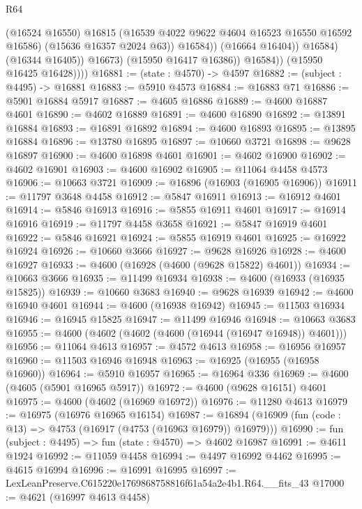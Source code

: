 \begin{lexlean}{R64}
\begin{coremodule}
                              (@16524 @16550)
                              @16815
                              (@16539 @4022 @9622 @4604 @16523 @16550 @16592 @16586)
                              (@15636 @16357 @2024 @63))
                            @16584))
                        (@16664 @16404))
                      @16584)
                    (@16344 @16405))
                  @16673)
                (@15950 @16417 @16386))
              @16584))
          (@15950 @16425 @16428))))
@16881 := (state : @4570) -> @4597
@16882 := (subject : @4495) -> @16881
@16883 := @5910 @4573
@16884 := @16883 @71
@16886 := @5901 @16884 @5917
@16887 := @4605 @16886
@16889 := @4600 @16887 @4601
@16890 := @4602 @16889
@16891 := @4600 @16890
@16892 := @13891 @16884
@16893 := @16891 @16892
@16894 := @4600 @16893
@16895 := @13895 @16884
@16896 := @13780 @16895
@16897 := @10660 @3721
@16898 := @9628 @16897
@16900 := @4600 @16898 @4601
@16901 := @4602 @16900
@16902 := @4602 @16901
@16903 := @4600 @16902
@16905 := @11064 @4458 @4573
@16906 := @10663 @3721
@16909 := @16896 (@16903 (@16905 @16906))
@16911 := @11797 @3648 @4458
@16912 := @5847 @16911
@16913 := @16912 @4601
@16914 := @5846 @16913
@16916 := @5855 @16911 @4601
@16917 := @16914 @16916
@16919 := @11797 @4458 @3658
@16921 := @5847 @16919 @4601
@16922 := @5846 @16921
@16924 := @5855 @16919 @4601
@16925 := @16922 @16924
@16926 := @10660 @3666
@16927 := @9628 @16926
@16928 := @4600 @16927
@16933 := @4600 (@16928 (@4600 (@9628 @15822) @4601))
@16934 := @10663 @3666
@16935 := @11499 @16934
@16938 := @4600 (@16933 (@16935 @15825))
@16939 := @10660 @3683
@16940 := @9628 @16939
@16942 := @4600 @16940 @4601
@16944 := @4600 (@16938 @16942)
@16945 := @11503 @16934
@16946 := @16945 @15825
@16947 := @11499 @16946
@16948 := @10663 @3683
@16955 := @4600 (@4602 (@4602 (@4600 (@16944 (@16947 @16948)) @4601)))
@16956 := @11064 @4613
@16957 := @4572 @4613
@16958 := @16956 @16957
@16960 := @11503 @16946 @16948
@16963 := @16925 (@16955 (@16958 @16960))
@16964 := @5910 @16957
@16965 := @16964 @336
@16969 := @4600 (@4605 (@5901 @16965 @5917))
@16972 := @4600 (@9628 @16151) @4601
@16975 := @4600 (@4602 (@16969 @16972))
@16976 := @11280 @4613
@16979 := @16975 (@16976 @16965 @16154)
@16987 := @16894 (@16909 (fun (code : @13) => @4753 (@16917 (@4753 (@16963 @16979)) @16979)))
@16990 := fun (subject : @4495) => fun (state : @4570) => @4602 @16987
@16991 := @4611 @1924
@16992 := @11059 @4458
@16994 := @4497 @16992 @4462
@16995 := @4615 @16994
@16996 := @16991 @16995
@16997 := LexLeanPreserve.C615220e1769868758816f61a54a2e4b1.R64.__fits_43
@17000 := @4621 (@16997 @4613 @4458)

\end{coremodule}
\end{lexlean}
